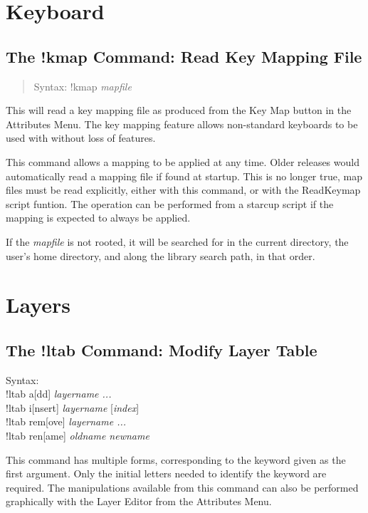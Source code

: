 \section{Keyboard}

\subsection{The {\cb !kmap} Command: Read Key Mapping File}
\begin{quote}
Syntax: {\vt !kmap} {\it mapfile}
\end{quote}
This will read a key mapping file as produced from the {\cb Key Map}
button in the {\cb Attributes Menu}.  The key mapping feature allows
non-standard keyboards to be used with {\Xic} without loss of
features.

This command allows a mapping to be applied at any time.  Older {\Xic}
releases would automatically read a mapping file if found at startup. 
This is no longer true, map files must be read explicitly, either with
this command, or with the {\vt ReadKeymap} script funtion.  The
operation can be performed from a starcup script if the mapping is
expected to always be applied.

If the {\it mapfile} is not rooted, it will be searched for in the
current directory, the user's home directory, and along the library
search path, in that order.


\section{Layers}

\subsection{The {\cb !ltab} Command: Modify Layer Table}
\begin{description}
\item{Syntax:}\\
 {\vt !ltab} {\vt a}[{\vt dd}]    {\it layername ...}\\
 {\vt !ltab} {\vt i}[{\vt nsert}] {\it layername} [{\it index\/}]\\
 {\vt !ltab} {\vt rem}[{\vt ove}] {\it layername ...}\\
 {\vt !ltab} {\vt ren}[{\vt ame}] {\it oldname newname}\\
\end{description}
This command has multiple forms, corresponding to the keyword given as
the first argument.  Only the initial letters needed to identify the
keyword are required.  The manipulations available from this command
can also be performed graphically with the {\cb Layer Editor} from the
{\cb Attributes Menu}.

